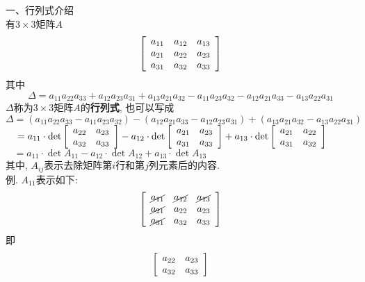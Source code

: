 \documentclass[UTF8, fontset=ubuntu]{ctexart}
\begin{document}
一、行列式介绍\\[1ex]
有$3\times 3$矩阵$A$
\[\left[\begin{array}{l l l}
a_{11} & a_{12} & a_{13}\\
a_{21} & a_{22} & a_{23}\\
a_{31} & a_{32} & a_{33}
\end{array}\right]\]
其中
\[\Delta=a_{11}a_{22}a_{33}+a_{12}a_{23}a_{31}+a_{13}a_{21}a_{32}-a_{11}a_{23}a_{32}-a_{12}a_{21}a_{33}-a_{13}a_{22}a_{31}\]
$\Delta$称为$3\times 3$矩阵$A$的\textbf{行列式}, 也可以写成\\
$\Delta=(a_{11}a_{22}a_{33}-a_{11}a_{23}a_{32})-(a_{12}a_{21}a_{33}-a_{12}a_{23}a_{31})+(a_{13}a_{21}a_{32}-a_{13}a_{22}a_{31})$\\[1ex]
$\phantom{\Delta}=a_{11}\cdot\det\left[\begin{array}{l l}
a_{22} & a_{23}\\
a_{32} & a_{33}
\end{array}\right]-a_{12}\cdot\det\left[\begin{array}{l l}
a_{21} & a_{23}\\
a_{31} & a_{33}
\end{array}\right]+a_{13}\cdot\det\left[\begin{array}{l l}
a_{21} & a_{22}\\
a_{31} & a_{32}
\end{array}\right]$\\[1ex]
$\phantom{\Delta}=a_{11}\cdot\det A_{11}-a_{12}\cdot\det A_{12}+a_{13}\cdot\det A_{13}$\\
其中, $A_{ij}$表示去除矩阵第$i$行和第$j$列元素后的内容.\\
例. $A_{11}$表示如下:\\
\[\left[\begin{array}{l l l}
\cancel{a_{11}} & \cancel{a_{12}} & \cancel{a_{13}}\\
\cancel{a_{21}} & a_{22} & a_{23}\\
\cancel{a_{31}} & a_{32} & a_{33}
\end{array}\right]\]
即
\[\left[\begin{array}{l l}
a_{22} & a_{23}\\
a_{32} & a_{33}
\end{array}\right]\]
\end{document}
